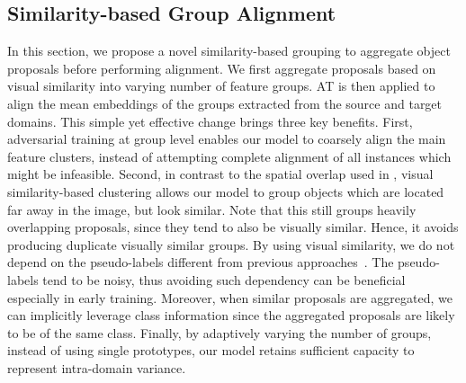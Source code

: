\documentclass[10pt,twocolumn,letterpaper]{article}
\begin{document}
\subsection{Similarity-based Group Alignment} 
\label{sec:visga}
In this section, we propose a novel similarity-based grouping to aggregate object proposals before performing alignment.
We first aggregate proposals based on visual similarity into varying number of feature groups.
AT is then applied to align the mean embeddings of the groups extracted from the source and target domains. 
This simple yet effective change brings three key benefits. 
First, adversarial training at group level enables our model to coarsely align the main feature clusters, instead of attempting complete alignment of all instances which might be infeasible.
Second, in contrast to the spatial overlap used in \cite{GPA, zhu_cvpr19_selective_alignment}, visual similarity-based clustering allows our model to group objects which are located far away in the image, but look similar. 
Note that this still groups heavily overlapping proposals, since they tend to also be visually similar. Hence, it avoids producing duplicate visually similar groups.
By using visual similarity, we do not depend on the pseudo-labels different from  previous approaches~\cite{GPA, zheng_cvpr20_prototype}.  
The pseudo-labels tend to be noisy,   thus avoiding such dependency can be beneficial especially in early training.
Moreover, when similar proposals are aggregated, we can implicitly leverage class information since the aggregated proposals are likely to be of the same class. 
Finally, by adaptively varying the number of groups, instead of using single prototypes, our model retains sufficient capacity to represent intra-domain variance. 
\end{document}

